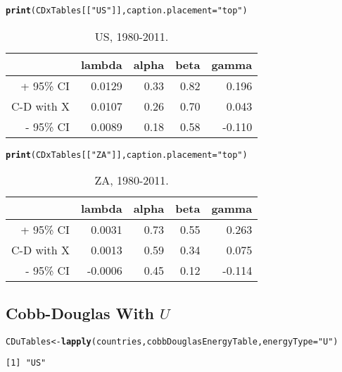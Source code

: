 \documentclass[preprint,authoryear,12pt]{elsarticle}\usepackage{graphicx, color}
\makeatletter
\newcommand{\hlfunctioncall}[1]{\textcolor[rgb]{0.501960784313725,0,0.329411764705882}{\textbf{#1}}}%
\newcommand{\hlstring}[1]{\textcolor[rgb]{0.6,0.6,1}{#1}}%
\newenvironment{kframe}{%
 \def\at@end@of@kframe{}%
 \ifinner\ifhmode%
  \def\at@end@of@kframe{\end{minipage}}%
  \begin{minipage}{\columnwidth}%
 \fi\fi%
 \def\FrameCommand##1{\hskip\@totalleftmargin \hskip-\fboxsep
 \colorbox{shadecolor}{##1}\hskip-\fboxsep
     \hskip-\linewidth \hskip-\@totalleftmargin \hskip\columnwidth}%
 \MakeFramed {\advance\hsize-\width
   \@totalleftmargin\z@ \linewidth\hsize
   \@setminipage}}%
 {\par\unskip\endMakeFramed%
 \at@end@of@kframe}
\newenvironment{knitrout}{}{} %
\makeatother
\begin{document}
\begin{kframe}
\begin{alltt}
\hlfunctioncall{print}(CDxTables[[\hlstring{"US"}]], caption.placement=\hlstring{"top"})
\end{alltt}
\end{kframe}%
\begin{table}[ht]
\begin{center}
\caption{US, 1980-2011.}
\begin{tabular}{rrrrr}
  \hline
 & lambda & alpha & beta & gamma \\ 
  \hline
+ 95\% CI & 0.0129 & 0.33 & 0.82 & 0.196 \\ 
  C-D with X & 0.0107 & 0.26 & 0.70 & 0.043 \\ 
  - 95\% CI & 0.0089 & 0.18 & 0.58 & -0.110 \\ 
   \hline
\end{tabular}
\end{center}
\end{table}
\begin{kframe}\begin{alltt}
\hlfunctioncall{print}(CDxTables[[\hlstring{"ZA"}]], caption.placement=\hlstring{"top"})
\end{alltt}
\end{kframe}%
\begin{table}[ht]
\begin{center}
\caption{ZA, 1980-2011.}
\begin{tabular}{rrrrr}
  \hline
 & lambda & alpha & beta & gamma \\ 
  \hline
+ 95\% CI & 0.0031 & 0.73 & 0.55 & 0.263 \\ 
  C-D with X & 0.0013 & 0.59 & 0.34 & 0.075 \\ 
  - 95\% CI & -0.0006 & 0.45 & 0.12 & -0.114 \\ 
   \hline
\end{tabular}
\end{center}
\end{table}



\subsection{Cobb-Douglas With $U$}

\begin{knitrout}
\color{fgcolor}\begin{kframe}
\begin{alltt}
CDuTables <- \hlfunctioncall{lapply}(countries, cobbDouglasEnergyTable, energyType=\hlstring{"U"})
\end{alltt}
\begin{verbatim}
[1] "US"
\end{verbatim}


{\ttfamily\noindent\bfseries\color{errorcolor}{Error: Missing value or an infinity produced when evaluating the model}}\end{kframe}
\end{knitrout}
\end{document}
